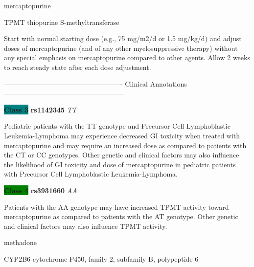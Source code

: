\documentclass{resume} %
\begin{document}
\begin{rSection}{ mercaptopurine }
\begin{rSubsection}{ TPMT }{ thiopurine S-methyltransferase }{}{}
\item[] Start with normal starting dose (e.g., 75 mg/m2/d or 1.5 mg/kg/d) and adjust doses of mercaptopurine (and of any other myelosuppressive therapy) without any special emphasis on mercaptopurine compared to other agents. Allow 2 weeks to reach steady state after each dose adjustment.
\item[] ---------------------------------------------------- Clinical Annotations -----------------------------------------------------\newline
\item \textbf{\colorbox{teal} {Class 3}} \textbf{ rs1142345 } \textit{ TT }
\item[] Pediatric patients with the TT genotype and Precursor Cell Lymphoblastic Leukemia-Lymphoma may experience decreased GI toxicity when treated with mercaptopurine and may require an increased dose as compared to patients with the CT or CC genotypes. Other genetic and clinical factors may also influence the likelihood of GI toxicity and dose of mercaptopurine in pediatric patients with Precursor Cell Lymphoblastic Leukemia-Lymphoma.\item \textbf{\colorbox{green} {Class 4}} \textbf{ rs3931660 } \textit{ AA }
\item[] Patients with the AA genotype may have increased TPMT activity toward mercaptopurine as compared to patients with the AT genotype. Other genetic and clinical factors may also influence TPMT activity. 
\end{rSubsection}

\end{rSection}\begin{rSection}{ methadone }
\item[]

\begin{rSubsection}{ CYP2B6 }{ cytochrome P450, family 2, subfamily B, polypeptide 6 }{}{}
\item[]


\end{rSubsection}
\end{rSection}
\end{document}
